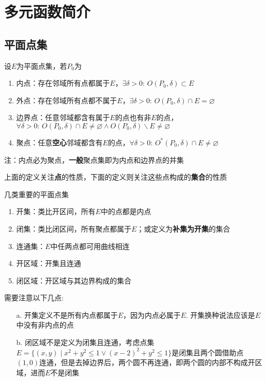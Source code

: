 
\section{多元函数简介}
\subsection{平面点集}
\begin{definition}
设$E$为平面点集，若$P_0$为
\begin{enumerate}
	\itemsep -3pt
	\item 内点：存在邻域所有点都属于$E$，$\exists\delta>0:\,O(P_0,\delta)\subset E$
	\item 外点：存在邻域所有点都不属于$E$，$\exists\delta>0:\,O(P_0,\delta)\cap E=\varnothing$
	\item 边界点：任意邻域都含有属于$E$的点也有非$E$的点，$\forall\delta>0:\,O(P_0,\delta)\cap E\ne\varnothing \land O(P_0,\delta)\backslash E\ne\varnothing$
	\item 聚点：任意\textbf{空心}邻域都含有$E$的点，$\forall\delta>0:\,O^*(P_0,\delta)\cap E\ne\varnothing$
\end{enumerate}
注：内点必为聚点，\textbf{一般}聚点集即为内点和边界点的并集
\end{definition}
上面的定义关注\textbf{点}的性质，下面的定义则关注这些点构成的\textbf{集合}的性质
\begin{definition}
几类重要的平面点集
\begin{enumerate}
	\itemsep -3pt
	\item 开集：类比开区间，所有$E$中的点都是内点
	\item 闭集：类比闭区间，所有聚点都属于$E$；或定义为\textbf{补集为开集}的集合
	\item 连通集：$E$中任两点都可用曲线相连
	\item 开区域：开集且连通
	\item 闭区域：开区域与其边界构成的集合
\end{enumerate}
需要注意以下几点:
\begin{enumerate}
	\itemsep -3pt
	\item[a.] 开集定义不是所有内点都属于$E$，因为内点必属于$E$. 开集换种说法应该是$E$中没有非内点的点
	\item[b.] 闭区域不是定义为闭集且连通，考虑点集$E=\{(x,y)\mid x^2+y^2\leq 1\lor (x-2)^2+y^2\leq 1\}$是闭集且两个圆借助点$(1,0)$连通，但是去掉边界后，两个圆不再连通，即两个圆的内部不构成开区域，进而$E$不是闭集
\end{enumerate}
\end{definition}
